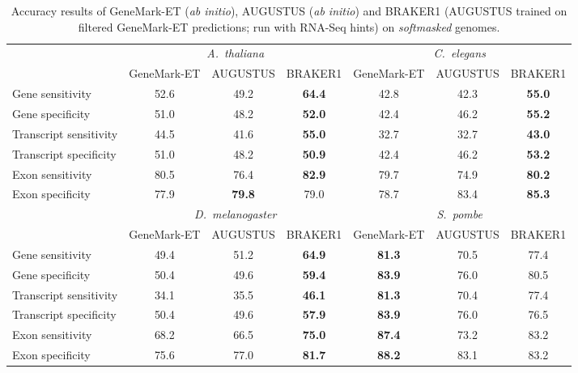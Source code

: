 \documentclass[a4paper,10pt]{report}
\begin{document}
\begin{table}[h!]
\begin{center}
 \begin{scriptsize}
 \begin{tabular}{|l|ccc|ccc|}
 \hline
& \multicolumn{3}{|c|}{\textit{A.~thaliana}} & \multicolumn{3}{|c|}{\textit{C.~elegans}}\\
& GeneMark-ET & AUGUSTUS & BRAKER1 & GeneMark-ET & AUGUSTUS & BRAKER1\\
\hline
Gene sensitivity        & 52.6 & 49.2 & \textbf{64.4} & 42.8 & 42.3 & \textbf{55.0}\\
Gene specificity        & 51.0 & 48.2 & \textbf{52.0} & 42.4 & 46.2 & \textbf{55.2}\\
Transcript sensitivity  & 44.5 & 41.6 & \textbf{55.0} & 32.7 & 32.7 & \textbf{43.0}\\
Transcript specificity  & 51.0 & 48.2 & \textbf{50.9} & 42.4 & 46.2 & \textbf{53.2}\\
Exon sensitivity        & 80.5 & 76.4 & \textbf{82.9} & 79.7 & 74.9 & \textbf{80.2}\\
Exon specificity        & 77.9 & \textbf{79.8} & 79.0 & 78.7 & 83.4 & \textbf{85.3}\\
\hline
& \multicolumn{3}{|c|}{\textit{D.~melanogaster}} & \multicolumn{3}{|c|}{\textit{S.~pombe}}\\
& GeneMark-ET & AUGUSTUS & BRAKER1 & GeneMark-ET & AUGUSTUS & BRAKER1\\
\hline
Gene sensitivity       & 49.4 & 51.2 & \textbf{64.9} & \textbf{81.3} & 70.5 & 77.4\\
Gene specificity       & 50.4 & 49.6 & \textbf{59.4} & \textbf{83.9} & 76.0 & 80.5\\
Transcript sensitivity & 34.1 & 35.5 & \textbf{46.1} & \textbf{81.3} & 70.4 & 77.4\\
Transcript specificity & 50.4 & 49.6 &\textbf{ 57.9} & \textbf{83.9} & 76.0 & 76.5\\
Exon sensitivity       & 68.2 & 66.5 & \textbf{75.0} & \textbf{87.4} & 73.2 & 83.2\\
Exon specificity       & 75.6 & 77.0 & \textbf{81.7} & \textbf{88.2} & 83.1 & 83.2\\
\hline
 \end{tabular}
\end{scriptsize}
\end{center}
\caption{Accuracy results of GeneMark-ET (\textit{ab initio}), AUGUSTUS (\textit{ab initio}) and BRAKER1 (AUGUSTUS trained on filtered GeneMark-ET predictions; run with RNA-Seq hints) on \textit{softmasked} genomes.
 \label{compare}}
\end{table}
\end{document}
